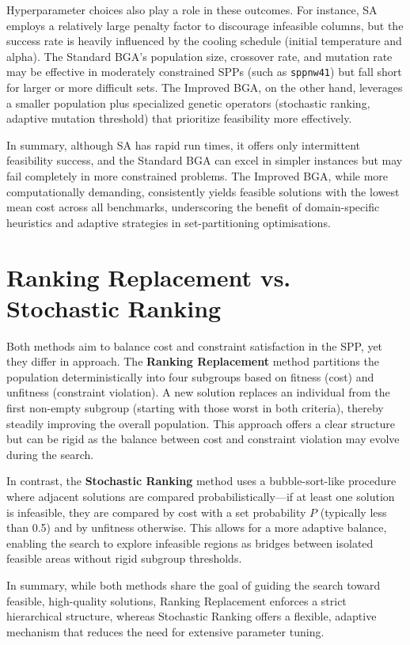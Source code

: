 \documentclass[12pt]{article}
\begin{document}
Hyperparameter choices also play a role in these outcomes. For instance, SA employs a relatively large penalty factor to discourage infeasible columns, but the success rate is heavily influenced by the cooling schedule (initial temperature and alpha). The Standard BGA’s population size, crossover rate, and mutation rate may be effective in moderately constrained SPPs (such as \texttt{sppnw41}) but fall short for larger or more difficult sets. The Improved BGA, on the other hand, leverages a smaller population plus specialized genetic operators (stochastic ranking, adaptive mutation threshold) that prioritize feasibility more effectively.

In summary, although SA has rapid run times, it offers only intermittent feasibility success, and the Standard BGA can excel in simpler instances but may fail completely in more constrained problems. The Improved BGA, while more computationally demanding, consistently yields feasible solutions with the lowest mean cost across all benchmarks, underscoring the benefit of domain-specific heuristics and adaptive strategies in set-partitioning optimisations.

\section{Ranking Replacement vs. Stochastic Ranking}
\label{sec:ranking}
Both methods aim to balance cost and constraint satisfaction in the SPP, yet they differ in approach. The \textbf{Ranking Replacement} method \cite{ChuAndBeasley1998} partitions the population deterministically into four subgroups based on fitness (cost) and unfitness (constraint violation). A new solution replaces an individual from the first non-empty subgroup (starting with those worst in both criteria), thereby steadily improving the overall population. This approach offers a clear structure but can be rigid as the balance between cost and constraint violation may evolve during the search.

In contrast, the \textbf{Stochastic Ranking} method \cite{RunarssonYao2000} uses a bubble-sort-like procedure where adjacent solutions are compared probabilistically—if at least one solution is infeasible, they are compared by cost with a set probability \(P\) (typically less than 0.5) and by unfitness otherwise. This allows for a more adaptive balance, enabling the search to explore infeasible regions as bridges between isolated feasible areas without rigid subgroup thresholds.

In summary, while both methods share the goal of guiding the search toward feasible, high-quality solutions, Ranking Replacement enforces a strict hierarchical structure, whereas Stochastic Ranking offers a flexible, adaptive mechanism that reduces the need for extensive parameter tuning.
\end{document}
